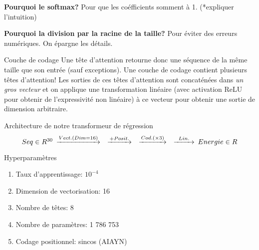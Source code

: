 \documentclass{beamer}
\begin{document}
\begin{frame}{}
    
{\bf Pourquoi le softmax?}
Pour que les coéfficients somment à 1. (*expliquer l'intuition)

{\bf Pourquoi la division par la racine de la taille? }
Pour éviter des erreurs numériques. On épargne les détails.

\end{frame}

\begin{frame}{Couche de codage}
    Une tête d'attention retourne donc une séquence de la même taille que son entrée (sauf exceptions).
    Une couche de codage contient plusieurs têtes d'attention! Les sorties de ces 
    têtes d'attention sont concaténées dans {\it un gros vecteur} et on applique une transformation 
    linéaire (avec activation ReLU pour obtenir de l'expressivité non linéaire) à ce vecteur pour obtenir une sortie 
    de dimension arbitraire.
\end{frame}



\begin{frame}{Architecture de notre transformeur de régression}
\begin{equation*}
    \begin{CD}
        @. Seq \in R^{30}
        @>Vect. (Dim=16)>> 
        @>+Posit.>> 
        @>Cod. (\times 3)>> 
        @>Lin.>> Energie \in R
    \end{CD}
\end{equation*}

\begin{block}{Hyperparamètres}
\begin{enumerate}
    \item Taux d'apprentissage: $10^{-4}$
    \item Dimension de vectorisation: 16
    \item Nombre de têtes: 8
    \item Nombre de paramètres: 1 786 753 
    \item Codage positionnel: sincos (AIAYN)
\end{enumerate}
\end{block}
\end{frame}
\end{document}
